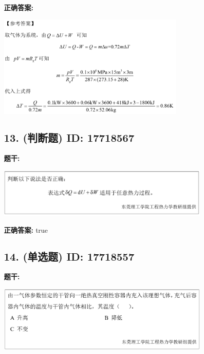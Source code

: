 \documentclass[12pt]{article}
\begin{document}
\textbf{正确答案:}

\begin{center}\includegraphics[width=0.7\textwidth, height=0.2\textheight, keepaspectratio]{question_12_17718576/correct_answer_1_img_1.png}\end{center}

\vspace{0.5em}\hrulefill\vspace{1em}

\subsection*{13. (判断题) \small ID: 17718567}

\textbf{题干:}


\begin{center}\includegraphics[width=0.8\textwidth, height=0.25\textheight, keepaspectratio]{question_13_17718567/title_img_1.png}\end{center}

\textbf{正确答案:}
true

\vspace{0.5em}\hrulefill\vspace{1em}

\subsection*{14. (单选题) \small ID: 17718557}

\textbf{题干:}


\begin{center}\includegraphics[width=0.8\textwidth, height=0.25\textheight, keepaspectratio]{question_14_17718557/title_img_1.png}\end{center}
\end{document}
